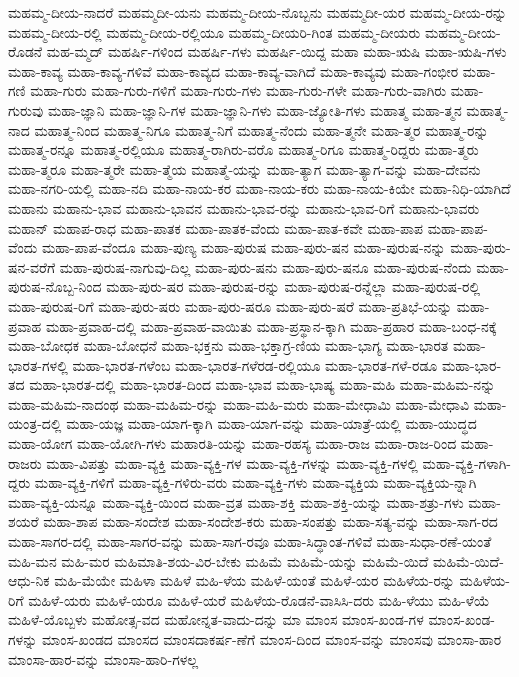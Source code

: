 {ಮಹಮ್ಮ-ದೀಯ-ನಾದರೆ
ಮಹಮ್ಮದೀ-ಯನು
ಮಹಮ್ಮ-ದೀಯ-ನೊಬ್ಬನು
ಮಹಮ್ಮದೀ-ಯರ
ಮಹಮ್ಮ-ದೀಯ-ರನ್ನು
ಮಹಮ್ಮ-ದೀಯ-ರಲ್ಲಿ
ಮಹಮ್ಮ-ದೀಯ-ರಲ್ಲಿಯೂ
ಮಹಮ್ಮ-ದೀಯರಿ-ಗಿಂತ
ಮಹಮ್ಮ-ದೀಯರು
ಮಹಮ್ಮ-ದೀಯ-ರೊಡನೆ
ಮಹ-ಮ್ಮದ್
ಮಹರ್ಷಿ-ಗಳಿಂದ
ಮಹರ್ಷಿ-ಗಳು
ಮಹರ್ಷಿ-ಯಿದ್ದ
ಮಹಾ
ಮಹಾ-ಋಷಿ
ಮಹಾ-ಋಷಿ-ಗಳು
ಮಹಾ-ಕಾವ್ಯ
ಮಹಾ-ಕಾವ್ಯ-ಗಳಿವೆ
ಮಹಾ-ಕಾವ್ಯದ
ಮಹಾ-ಕಾವ್ಯ-ವಾಗಿದೆ
ಮಹಾ-ಕಾವ್ಯವು
ಮಹಾ-ಗಂಭೀರ
ಮಹಾ-ಗಣಿ
ಮಹಾ-ಗುರು
ಮಹಾ-ಗುರು-ಗಳಿಗೆ
ಮಹಾ-ಗುರು-ಗಳು
ಮಹಾ-ಗುರು-ಗಳೇ
ಮಹಾ-ಗುರು-ವಾಗಿರು
ಮಹಾ-ಗುರುವು
ಮಹಾ-ಜ್ಞಾನಿ
ಮಹಾ-ಜ್ಞಾನಿ-ಗಳ
ಮಹಾ-ಜ್ಞಾನಿ-ಗಳು
ಮಹಾ-ಜ್ಯೋತಿ-ಗಳು
ಮಹಾತ್ಮ
ಮಹಾ-ತ್ಮನ
ಮಹಾತ್ಮ-ನಾದ
ಮಹಾತ್ಮ-ನಿಂದ
ಮಹಾತ್ಮ-ನಿಗೂ
ಮಹಾತ್ಮ-ನಿಗೆ
ಮಹಾತ್ಮ-ನೆಂದು
ಮಹಾ-ತ್ಮನೇ
ಮಹಾ-ತ್ಮರ
ಮಹಾತ್ಮ-ರನ್ನು
ಮಹಾತ್ಮ-ರನ್ನೂ
ಮಹಾತ್ಮ-ರಲ್ಲಿಯೂ
ಮಹಾತ್ಮ-ರಾಗಿರು-ವರೊ
ಮಹಾತ್ಮ-ರಿಗೂ
ಮಹಾತ್ಮ-ರಿದ್ದರು
ಮಹಾ-ತ್ಮರು
ಮಹಾ-ತ್ಮರೂ
ಮಹಾ-ತ್ಮರೇ
ಮಹಾ-ತ್ಮೆಯ
ಮಹಾತ್ಮೆ-ಯನ್ನು
ಮಹಾ-ತ್ಯಾಗ
ಮಹಾ-ತ್ಯಾಗ-ವನ್ನು
ಮಹಾ-ದೇವನು
ಮಹಾ-ನಗರಿ-ಯಲ್ಲಿ
ಮಹಾ-ನದಿ
ಮಹಾ-ನಾಯ-ಕರ
ಮಹಾ-ನಾಯ-ಕರು
ಮಹಾ-ನಾಯ-ಕಿಯೇ
ಮಹಾ-ನಿಧಿ-ಯಾಗಿದೆ
ಮಹಾನು
ಮಹಾನು-ಭಾವ
ಮಹಾನು-ಭಾವನ
ಮಹಾನು-ಭಾವ-ರನ್ನು
ಮಹಾನು-ಭಾವ-ರಿಗೆ
ಮಹಾನು-ಭಾವರು
ಮಹಾನ್
ಮಹಾಪ-ರಾಧ
ಮಹಾ-ಪಾತಕ
ಮಹಾ-ಪಾತಕ-ವೆಂದು
ಮಹಾ-ಪಾತ-ಕವೇ
ಮಹಾ-ಪಾಪ
ಮಹಾ-ಪಾಪ-ವೆಂದು
ಮಹಾ-ಪಾಪ-ವೆಂದೂ
ಮಹಾ-ಪುಣ್ಯ
ಮಹಾ-ಪುರುಷ
ಮಹಾ-ಪುರು-ಷನ
ಮಹಾ-ಪುರುಷ-ನನ್ನು
ಮಹಾ-ಪುರು-ಷನ-ವರೆಗೆ
ಮಹಾ-ಪುರುಷ-ನಾಗುವು-ದಿಲ್ಲ
ಮಹಾ-ಪುರು-ಷನು
ಮಹಾ-ಪುರು-ಷನೂ
ಮಹಾ-ಪುರುಷ-ನೆಂದು
ಮಹಾ-ಪುರುಷ-ನೊಬ್ಬ-ನಿಂದ
ಮಹಾ-ಪುರು-ಷರ
ಮಹಾ-ಪುರುಷ-ರನ್ನು
ಮಹಾ-ಪುರುಷ-ರನ್ನೆಲ್ಲಾ
ಮಹಾ-ಪುರುಷ-ರಲ್ಲಿ
ಮಹಾ-ಪುರುಷ-ರಿಗೆ
ಮಹಾ-ಪುರು-ಷರು
ಮಹಾ-ಪುರು-ಷರೂ
ಮಹಾ-ಪುರು-ಷರೆ
ಮಹಾ-ಪ್ರತಿಭೆ-ಯನ್ನು
ಮಹಾ-ಪ್ರವಾಹ
ಮಹಾ-ಪ್ರವಾಹ-ದಲ್ಲಿ
ಮಹಾ-ಪ್ರವಾಹ-ವಾಯಿತು
ಮಹಾ-ಪ್ರಸ್ಥಾನ-ಕ್ಕಾಗಿ
ಮಹಾ-ಪ್ರಹಾರ
ಮಹಾ-ಬಂಧ-ನಕ್ಕೆ
ಮಹಾ-ಬೋಧಕ
ಮಹಾ-ಬೋಧನೆ
ಮಹಾ-ಭಕ್ತನು
ಮಹಾ-ಭಕ್ತಾಗ್ರ-ಣಿಯ
ಮಹಾ-ಭಾಗ್ಯ
ಮಹಾ-ಭಾರತ
ಮಹಾ-ಭಾರತ-ಗಳಲ್ಲಿ
ಮಹಾ-ಭಾರತ-ಗಳೆಂಬ
ಮಹಾ-ಭಾರತ-ಗಳೆರಡ-ರಲ್ಲಿಯೂ
ಮಹಾ-ಭಾರತ-ಗಳೆ-ರಡೂ
ಮಹಾ-ಭಾರ-ತದ
ಮಹಾ-ಭಾರತ-ದಲ್ಲಿ
ಮಹಾ-ಭಾರತ-ದಿಂದ
ಮಹಾ-ಭಾವ
ಮಹಾ-ಭಾಷ್ಯ
ಮಹಾ-ಮಹಿ
ಮಹಾ-ಮಹಿಮ-ನನ್ನು
ಮಹಾ-ಮಹಿಮ-ನಾದಂಥ
ಮಹಾ-ಮಹಿಮ-ರನ್ನು
ಮಹಾ-ಮಹಿ-ಮರು
ಮಹಾ-ಮೇಧಾಮಿ
ಮಹಾ-ಮೇಧಾವಿ
ಮಹಾ-ಯಂತ್ರ-ದಲ್ಲಿ
ಮಹಾ-ಯಜ್ಞ
ಮಹಾ-ಯಾಗ-ಕ್ಕಾಗಿ
ಮಹಾ-ಯಾಗ-ವನ್ನು
ಮಹಾ-ಯಾತ್ರೆ-ಯಲ್ಲಿ
ಮಹಾ-ಯುದ್ಧದ
ಮಹಾ-ಯೋಗ
ಮಹಾ-ಯೋಗಿ-ಗಳು
ಮಹಾರತಿ-ಯನ್ನು
ಮಹಾ-ರಹಸ್ಯ
ಮಹಾ-ರಾಜ
ಮಹಾ-ರಾಜ-ರಿಂದ
ಮಹಾ-ರಾಜರು
ಮಹಾ-ವಿಪತ್ತು
ಮಹಾ-ವ್ಯಕ್ತಿ
ಮಹಾ-ವ್ಯಕ್ತಿ-ಗಳ
ಮಹಾ-ವ್ಯಕ್ತಿ-ಗಳನ್ನು
ಮಹಾ-ವ್ಯಕ್ತಿ-ಗಳಲ್ಲಿ
ಮಹಾ-ವ್ಯಕ್ತಿ-ಗಳಾಗಿ-ದ್ದರು
ಮಹಾ-ವ್ಯಕ್ತಿ-ಗಳಿಗೆ
ಮಹಾ-ವ್ಯಕ್ತಿ-ಗಳಿರು-ವರು
ಮಹಾ-ವ್ಯಕ್ತಿ-ಗಳು
ಮಹಾ-ವ್ಯಕ್ತಿಯ
ಮಹಾ-ವ್ಯಕ್ತಿಯ-ನ್ನಾಗಿ
ಮಹಾ-ವ್ಯಕ್ತಿ-ಯನ್ನೂ
ಮಹಾ-ವ್ಯಕ್ತಿ-ಯಿಂದ
ಮಹಾ-ವ್ರತ
ಮಹಾ-ಶಕ್ತಿ
ಮಹಾ-ಶಕ್ತಿ-ಯನ್ನು
ಮಹಾ-ಶತ್ರು-ಗಳು
ಮಹಾ-ಶಯರೆ
ಮಹಾ-ಶಾಪ
ಮಹಾ-ಸಂದೇಶ
ಮಹಾ-ಸಂದೇಶ-ಕರು
ಮಹಾ-ಸಂಪತ್ತು
ಮಹಾ-ಸತ್ಯ-ವನ್ನು
ಮಹಾ-ಸಾಗ-ರದ
ಮಹಾ-ಸಾಗರ-ದಲ್ಲಿ
ಮಹಾ-ಸಾಗರ-ವನ್ನು
ಮಹಾ-ಸಾಗ-ರವೂ
ಮಹಾ-ಸಿದ್ಧಾಂತ-ಗಳಿವೆ
ಮಹಾ-ಸುಧಾ-ರಣೆ-ಯಂತೆ
ಮಹಿ-ಮನ
ಮಹಿ-ಮರ
ಮಹಿಮಾತಿ-ಶಯ-ವಿರ-ಬೇಕು
ಮಹಿಮೆ
ಮಹಿಮೆ-ಯನ್ನು
ಮಹಿಮೆ-ಯಿದೆ
ಮಹಿಮೆ-ಯಿದೆ-ಆಧು-ನಿಕ
ಮಹಿ-ಮೆಯೇ
ಮಹಿಳಾ
ಮಹಿಳೆ
ಮಹಿ-ಳೆಯ
ಮಹಿಳೆ-ಯಂತೆ
ಮಹಿಳೆ-ಯರ
ಮಹಿಳೆಯ-ರನ್ನು
ಮಹಿಳೆಯ-ರಿಗೆ
ಮಹಿಳೆ-ಯರು
ಮಹಿಳೆ-ಯರೂ
ಮಹಿಳೆ-ಯರೆ
ಮಹಿಳೆಯ-ರೊಡನೆ-ವಾಸಿಸಿ-ದರು
ಮಹಿ-ಳೆಯು
ಮಹಿ-ಳೆಯೆ
ಮಹಿಳೆ-ಯೊಬ್ಬಳು
ಮಹೋತ್ಸ-ವದ
ಮಹೋನ್ನತ-ವಾದು-ದನ್ನು
ಮಾ
ಮಾಂಸ
ಮಾಂಸ-ಖಂಡ-ಗಳ
ಮಾಂಸ-ಖಂಡ-ಗಳನ್ನು
ಮಾಂಸ-ಖಂಡದ
ಮಾಂಸದ
ಮಾಂಸದಾಕರ್ಷ-ಣೆಗೆ
ಮಾಂಸ-ದಿಂದ
ಮಾಂಸ-ವನ್ನು
ಮಾಂಸವು
ಮಾಂಸಾ-ಹಾರ
ಮಾಂಸಾ-ಹಾರ-ವನ್ನು
ಮಾಂಸಾ-ಹಾರಿ-ಗಳಲ್ಲ
}

